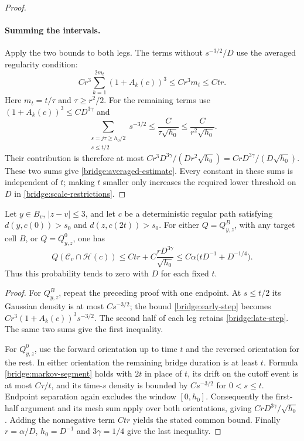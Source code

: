 \begin{proof}
\paragraph{Summing the intervals.}
Apply the two bounds to both legs.  The terms without $s^{-3/2}/D$
use the averaged regularity condition:
\[
 Cr^3\sum_{k=1}^{2m_t}(1+A_k(c))^3
 \le Cr^3m_t\le Ctr.
\]
Here $m_t=t/\tau$ and $\tau\ge r^2/2$.  For the remaining terms use
$(1+A_k(c))^3\le CD^{3\gamma}$ and
\[
 \sum_{\substack{s=j\tau\ge h_0/2\\s\le t/2}}s^{-3/2}
 \le \frac{C}{\tau\sqrt{h_0}}
 \le \frac{C}{r^2\sqrt{h_0}}.
\]
Their contribution is therefore at most
$Cr^3D^{3\gamma}/(Dr^2\sqrt{h_0})
=CrD^{3\gamma}/(D\sqrt{h_0})$.
These two sums give \eqref{bridge:averaged-estimate}.  Every constant in these
sums is independent of $t$; making $t$ smaller only increases the
required lower threshold on $D$ in
\eqref{bridge:scale-restrictions}.
\end{proof}

\begin{lemma}\label{lem:single-hit}
Let $y\in B_v$, $|z-v|\le3$, and let $c$ be a deterministic regular
path satisfying $d(y,c(0))>s_0$ and $d(z,c(2t))>s_0$.
For either $Q=Q_{y,z}^{B}$, with any target cell $B$, or
$Q=Q_{y,z}^{0}$, one has
\begin{equation}\label{bridge:single-estimate}
 Q(\mathcal C_v\cap\mathcal H(c))
 \le Ctr+C\frac{rD^{3\gamma}}{\sqrt{h_0}}
 \le C\alpha\bigl(tD^{-1}+D^{-1/4}\bigr).
\end{equation}
Thus this probability tends to zero with $D$ for each fixed $t$.
\end{lemma}

\begin{proof}
For $Q_{y,z}^{B}$, repeat the preceding proof with one endpoint.  At
$s\le t/2$ its Gaussian density is at most $Cs^{-3/2}$; the bound
\eqref{bridge:early-step} becomes
$Cr^3(1+A_k(c))^3s^{-3/2}$.  The second half of each leg retains
\eqref{bridge:late-step}.  The same two sums give the first inequality.

For $Q_{y,z}^{0}$, use the forward orientation up to time $t$ and the
reversed orientation for the rest.  In either orientation the
remaining bridge duration is at least $t$.  Formula
\eqref{bridge:markov-segment} holds with $2t$ in place of $t$, its
drift on the cutoff event is at most $C\tau/t$, and its time-$s$
density is bounded by $Cs^{-3/2}$ for $0<s\le t$.  Endpoint separation
again excludes the window $[0,h_0]$.  Consequently the first-half
argument and its mesh sum apply over both orientations, giving
$CrD^{3\gamma}/\sqrt{h_0}$.  Adding the nonnegative term $Ctr$ yields
the stated common bound.  Finally $r=\alpha/D$, $h_0=D^{-1}$ and
$3\gamma=1/4$ give the last inequality.
\end{proof}

